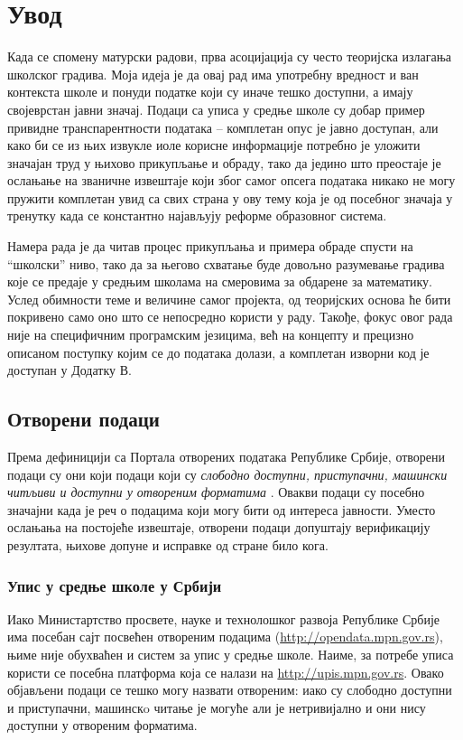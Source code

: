 \chapter{Увод}\label{ch:\thechapter}

Када се спомену матурски радови, прва асоцијација су често теоријска излагања школског градива. Моја идеја је да овај рад има употребну вредност и ван контекста школе и понуди податке који су иначе тешко доступни, а имају својеврстан јавни значај. Подаци са уписа у средње школе су добар пример привидне транспарентности података -- комплетан опус је јавно доступан, али како би се из њих извукле иоле корисне информације потребно је уложити значајан труд у њихово прикупљање и обраду, тако да једино што преостаје је ослањање на званичне извештаје који због самог опсега података никако не могу пружити комплетан увид са свих страна у ову тему која је од посебног значаја у тренутку када се константно најављују реформе образовног система.

Намера рада је да читав процес прикупљања и примера обраде спусти на \enquote{школски} ниво, тако да за његово схватање буде довољно разумевање градива које се предаје у средњим школама на смеровима за обдарене за математику. Услед обимности теме и величине самог пројекта, од теоријских основа ће бити покривено само оно што се непосредно користи у раду. Такође, фокус овог рада није на специфичним програмским језицима, већ на концепту и прецизно описаном поступку којим се до података долази, а комплетан изворни код је доступан у Додатку В.

\section{Отворени подаци}

Према дефиницији са Портала отворених података Републике Србије, отворени подаци су они који подаци који су \emph{слободно доступни, приступачни, машински читљиви и доступни у отвореним форматима} \citep{opendatadef}. Овакви подаци су посебно значајни када је реч о подацима који могу бити од интереса јавности. Уместо ослањања на постојеће извештаје, отворени подаци допуштају верификацију резултата, њихове допуне и исправке од стране било кога.

\subsection{Упис у средње школе у Србији}

Иако Министартство просвете, науке и технолошког развоја Републике Србије има посебан сајт посвећен отвореним подацима (\url{http://opendata.mpn.gov.rs}), њиме није обухваћен и систем за упис у средње школе. Наиме, за потребе уписа користи се посебна платформа која се налази на \url{http://upis.mpn.gov.rs}. Овако објављени подаци се тешко могу назвати отвореним: иако су слободно доступни и приступачни, машинскo читање је могуће али је нетривијално и они нису доступни у отвореним форматима. 

